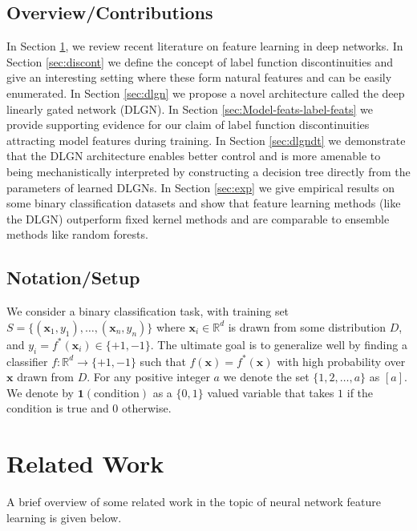 \documentclass{article} %
\renewcommand{\>}{{\rightarrow}}
\renewcommand{\=}{\stackrel{\triangle}{=}}
\newcommand{\0}{{\mathbf 0}}
\newcommand{\x}{{\mathbf x}}
\begin{document}
\subsection{Overview/Contributions}\label{sec:contri}

In Section \ref{sec:reltwork}, we review recent literature on feature learning in deep networks. In Section \ref{sec:discont} we define the concept of label function discontinuities and give an interesting setting where these form natural features and can be easily enumerated. In Section \ref{sec:dlgn} we propose a novel architecture called the deep linearly gated network (DLGN). In Section \ref{sec:Model-feats-label-feats} we provide supporting evidence for our claim of label function discontinuities attracting model features during training. In Section \ref{sec:dlgndt} we demonstrate that the DLGN architecture enables better control and is more amenable to being mechanistically interpreted by constructing a decision tree directly from the parameters of learned DLGNs.  In Section \ref{sec:exp} we give empirical results on some binary classification datasets and show that feature learning methods (like the DLGN) outperform fixed kernel methods and are comparable to ensemble methods like random forests.


\subsection{Notation/Setup} 

We consider a binary classification task, with training set $S=\{(\x_1, y_1) , \ldots, (\x_n, y_n) \}$ where $\x_i \in \mathbb{R}^d$ is drawn from some distribution $D$, and $ y_i = f^*(\x_i) \in \{+1, -1\} $.  The ultimate goal is to generalize well by finding a classifier $f:\mathbb{R}^d \> \{+1, -1\}$ such that $f(\x) = f^*(\x)$ with high probability over $\x$ drawn from $D$. For any positive integer $a$ we denote the set $\{1,2,\ldots,a\}$ as $[a]$. We denote by $\mathbf{1}(\text{condition})$ as a $\{0,1\}$ valued variable that takes $1$ if the condition is true and $0$ otherwise. 


\section{Related Work}\label{sec:reltwork}

A brief overview of some related work in the topic of neural network feature learning is given below.
\end{document}
